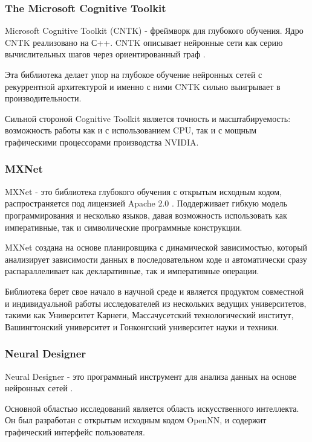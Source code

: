 \subsubsection{The Microsoft Cognitive Toolkit}

Microsoft Cognitive Toolkit (CNTK) - фреймворк для глубокого обучения. Ядро CNTK реализовано на С++. CNTK описывает нейронные сети как серию вычислительных шагов через ориентированный граф \cite{cntk_doc} .

Эта библиотека делает упор на глубокое обучение нейронных сетей с рекуррентной архитектурой и именно с ними CNTK сильно выигрывает в производительности.

Сильной стороной Cognitive Toolkit является точность и масштабируемость: возможность работы как и с использованием CPU, так и с мощным графическими процессорами производства NVIDIA.





\subsubsection{MXNet}

MXNet - это библиотека глубокого обучения с открытым исходным кодом, распространяется под лицензией Apache 2.0 \cite{mxnet_doc}. Поддерживает гибкую модель программирования и несколько языков, давая возможность использовать как императивные, так и символические программные конструкции.

MXNet создана на основе планировщика с динамической зависимостью, который анализирует зависимости данных в последовательном коде и автоматически сразу распараллеливает как декларативные, так и императивные операции.

Библиотека берет свое начало в научной среде и является продуктом совместной и индивидуальной работы исследователей из нескольких ведущих университетов, такими как Университет Карнеги, Массачусетский технологический институт, Вашингтонский университет и Гонконгский университет науки и техники.


\subsubsection{Neural Designer}

Neural Designer - это программный инструмент для анализа данных на основе нейронных сетей \cite{ND_doc} . 

Основной областью исследований является область искусственного интеллекта. Он был разработан с открытым исходным кодом OpenNN, и содержит графический интерфейс пользователя.

